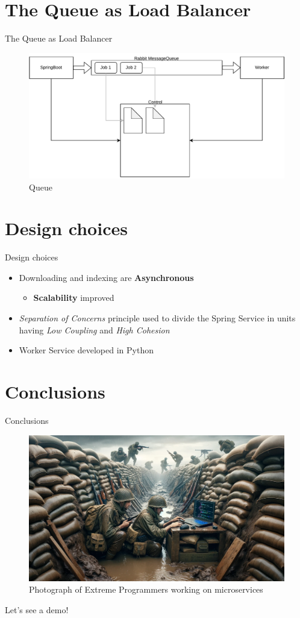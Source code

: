 \documentclass{beamer}
\begin{document}
\section{The Queue as Load Balancer}
\begin{frame}{The Queue as Load Balancer}
\begin{figure}[ht]
    \centering
    \includegraphics[width=1\linewidth] {queue.drawio}
    \caption{Queue}
    \label{fig:queue}
\end{figure}
\end{frame}

\section{Design choices}
\begin{frame}{Design choices}
\begin{itemize}
    \item Downloading and indexing are \textbf{Asynchronous}
    \begin{itemize}
        \item \textbf{Scalability} improved
    \end{itemize}
    \item \textit{Separation of Concerns} principle used to divide the
    Spring Service in units having \textit{Low Coupling} and \textit{High Cohesion}
    \item Worker Service developed in Python
\end{itemize}
\end{frame}

\section{Conclusions}
\begin{frame}{Conclusions}
\begin{figure}[ht]
    \centering
    \includegraphics[width=0.7\linewidth] {ep_trench.jpg}
    \caption{Photograph of Extreme Programmers working on microservices}
    \label{fig:ex}
\end{figure}
\centering
Let's see a demo!
\end{frame}
\end{document}
